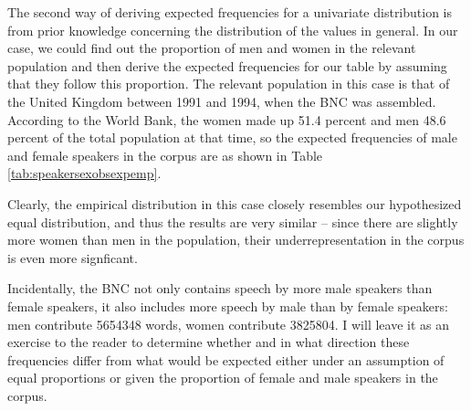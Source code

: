 The second way of deriving expected frequencies for a univariate distribution is from prior knowledge concerning the distribution of the values in general. In our case, we could find out the proportion of men and women in the relevant population and then derive the expected frequencies for our table by assuming that they follow this proportion. The relevant population in this case is that of the United Kingdom between 1991 and 1994, when the BNC was assembled. According to the World Bank, the women made up 51.4 percent and men 48.6 percent of the total population at that time, so the expected frequencies of male and female speakers in the corpus are as shown in Table \ref{tab:speakersexobsexpemp}.

\begin{table}[!htbp]
\caption{Observed and expected frequencies of Speaker Sex in the BNC (based on the proportions in the general population)}
\label{tab:speakersexobsexpemp}
\end{table}

Clearly, the empirical distribution in this case closely resembles our hypothesized equal distribution, and thus the results are very similar -- since there are slightly more women than men in the population, their underrepresentation in the corpus is even more signficant.

Incidentally, the BNC not only contains speech by more male speakers than female speakers, it also includes more speech by male than by female speakers: men contribute \num{5654348} words, women contribute \num{3825804}. I will leave it as an exercise to the reader to determine whether and in what direction these frequencies differ from what would be expected either under an assumption of equal proportions or given the proportion of female and male speakers in the corpus.

